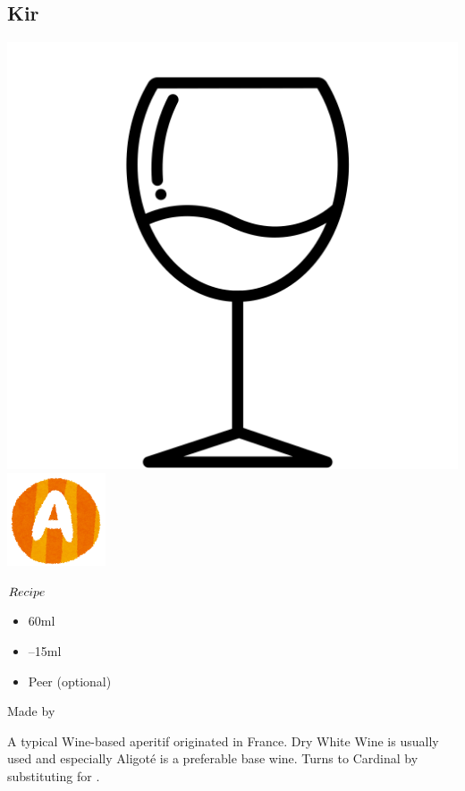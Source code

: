 \subsection{Kir}
\vspace{-7.6mm}
\hspace{18mm}
\includegraphics[scale=.03]{cocktail_glass_sour.png}
\includegraphics[scale=.12]{capital_a.png}
\vspace{2.5mm}
\begin{itembox}[l]{\boldmath $Recipe$}
\begin{itemize}
\setlength{\parskip}{0cm}
\setlength{\itemsep}{0cm}
\item \ww 60ml
\item {}--15ml
\item \lemon Peer (optional)
\end{itemize}
\vspace{-4mm}
Made by \build
\end{itembox}
A typical Wine-based aperitif originated in France.
Dry White Wine is usually used and especially Aligot\'{e} is a preferable base wine.
Turns to Cardinal by substituting \rw for \ww
\hspace{-1mm}.
